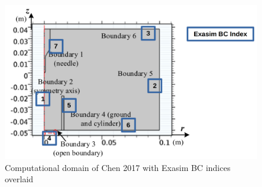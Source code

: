 \documentclass[12pt, a4paper]{report}
\begin{document}
\begin{figure}[!h]
    \centering
    \includegraphics*[width=.99\linewidth]{exasim_bc_index.png}
    \caption{Computational domain of Chen 2017 with Exasim BC indices overlaid}
    \label{<label>}
\end{figure}
\end{document}
